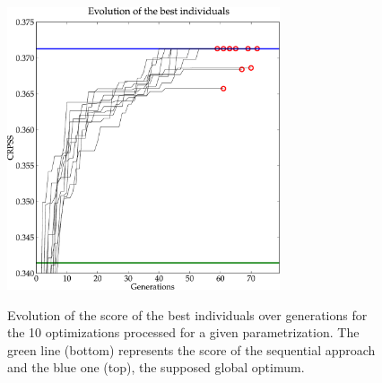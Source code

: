 \documentclass{ametsoc}
\begin{document}
\begin{figure}[t]
	\begin{center}
		\noindent\includegraphics[width=19pc,angle=0]{figures/gas_evolution_good.pdf}\\
	\end{center}
	\caption{Evolution of the score of the best individuals over generations for the 10 optimizations processed for a given parametrization. The green line (bottom) represents the score of the sequential approach and the blue one (top), the supposed global optimum.}
	\label{fig:gas_evolution_good}
\end{figure}
\end{document}
